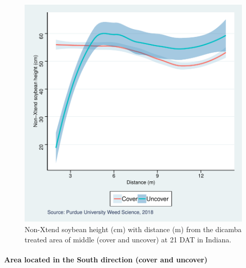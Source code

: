 \documentclass[]{article}
\let\oldparagraph\paragraph
\renewcommand{\paragraph}[1]{\oldparagraph{#1}\mbox{}}
\begin{document}
\begin{figure}
\centering
\includegraphics{Report_files/figure-latex/unnamed-chunk-40-1.pdf}
\caption{Non-Xtend soybean height (cm) with distance (m) from the
dicamba treated area of middle (cover and uncover) at 21 DAT in
Indiana.}
\end{figure}

\newpage

\paragraph{\texorpdfstring{Area located in the \textbf{South} direction
(cover and
uncover)}{Area located in the South direction (cover and uncover)}}\label{area-located-in-the-south-direction-cover-and-uncover}
\end{document}
